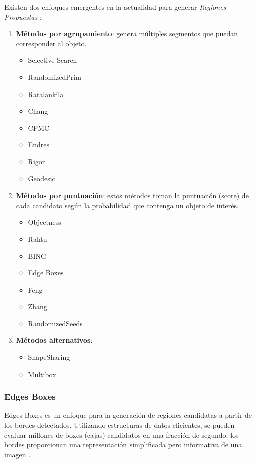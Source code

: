 Existen dos enfoques emergentes en la actualidad para generar \textit{Regiones Propuestas} \citep{proposal}:
\begin{enumerate}
\item \textbf{Métodos por agrupamiento}: genera múltiples segmentos que puedan corresponder al objeto.
	\begin{itemize}
	\item Selective Search
    \item RandomizedPrim
    \item Ratalankila
    \item Chang
    \item CPMC
    \item Endres
    \item Rigor
    \item Geodesic
	\end{itemize}
\item \textbf{Métodos por puntuación}: estos métodos toman la puntuación (score) de cada candidato según la probabilidad que contenga un objeto de interés.
    \begin{itemize}
    \item Objectness
    \item Rahtu
    \item BING
    \item Edge Boxes
    \item Feng
    \item Zhang
    \item RandomizedSeeds
    \end{itemize}
\item \textbf{Métodos alternativos}: 
    \begin{itemize}
    \item ShapeSharing
    \item Multibox
    \end{itemize}
\end{enumerate}

\subsubsection{Edges Boxes} \label{sub:edgesboxes}

Edges Boxes es un enfoque para la generación de regiones candidatas a partir de los bordes detectados. Utilizando estructuras de datos eficientes, se pueden evaluar millones de boxes (cajas) candidatos en una fracción de segundo; los bordes proporcionan una representación simplificada pero informativa de una imagen \citep{edges}.

